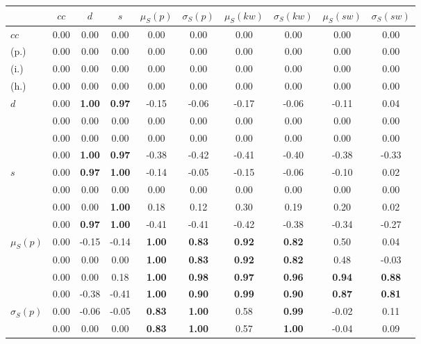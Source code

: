\begin{table*}[h!]
\begin{center}
\begin{tabular}{| l || c | c | c | c | c | c | c | c | c |}\hline
 & $cc$ & $d$ & $s$ & $\mu_S(p)$ & $\sigma_S(p)$ & $\mu_S(kw)$ & $\sigma_S(kw)$ & $\mu_S(sw)$ & $\sigma_S(sw)$ \\\hline\hline
$cc$ & 0.00  & 0.00  & 0.00  & 0.00  & 0.00  & 0.00  & 0.00  & 0.00  & 0.00 \\
(p.) & 0.00  & 0.00  & 0.00  & 0.00  & 0.00  & 0.00  & 0.00  & 0.00  & 0.00 \\
(i.) & 0.00  & 0.00  & 0.00  & 0.00  & 0.00  & 0.00  & 0.00  & 0.00  & 0.00 \\
(h.) & 0.00  & 0.00  & 0.00  & 0.00  & 0.00  & 0.00  & 0.00  & 0.00  & 0.00 \\\hline
$d$ & 0.00 & {\bf 1.00} & {\bf 0.97} & -0.15 & -0.06 & -0.17 & -0.06 & -0.11 & 0.04 \\
 & 0.00  & 0.00  & 0.00  & 0.00  & 0.00  & 0.00  & 0.00  & 0.00  & 0.00 \\\hline
 & 0.00  & 0.00  & 0.00  & 0.00  & 0.00  & 0.00  & 0.00  & 0.00  & 0.00 \\\hline
 & 0.00 & {\bf 1.00} & {\bf 0.97} & -0.38 & -0.42 & -0.41 & -0.40 & -0.38 & -0.33 \\\hline
$s$ & 0.00 & {\bf 0.97} & {\bf 1.00} & -0.14 & -0.05 & -0.15 & -0.06 & -0.10 & 0.02 \\
 & 0.00  & 0.00  & 0.00  & 0.00  & 0.00  & 0.00  & 0.00  & 0.00  & 0.00 \\\hline
 & 0.00 & 0.00 & {\bf 1.00} & 0.18 & 0.12 & 0.30 & 0.19 & 0.20 & 0.02 \\
 & 0.00 & {\bf 0.97} & {\bf 1.00} & -0.41 & -0.41 & -0.42 & -0.38 & -0.34 & -0.27 \\\hline
$\mu_S(p)$ & 0.00 & -0.15 & -0.14 & {\bf 1.00} & {\bf 0.83} & {\bf 0.92} & {\bf 0.82} & 0.50 & 0.04 \\
 & 0.00 & 0.00 & 0.00 & {\bf 1.00} & {\bf 0.83} & {\bf 0.92} & {\bf 0.82} & 0.48 & -0.03 \\
 & 0.00 & 0.00 & 0.18 & {\bf 1.00} & {\bf 0.98} & {\bf 0.97} & {\bf 0.96} & {\bf 0.94} & {\bf 0.88} \\
 & 0.00 & -0.38 & -0.41 & {\bf 1.00} & {\bf 0.90} & {\bf 0.99} & {\bf 0.90} & {\bf 0.87} & {\bf 0.81} \\\hline
$\sigma_S(p)$ & 0.00 & -0.06 & -0.05 & {\bf 0.83} & {\bf 1.00} & 0.58 & {\bf 0.99} & -0.02 & 0.11 \\
 & 0.00 & 0.00 & 0.00 & {\bf 0.83} & {\bf 1.00} & 0.57 & {\bf 1.00} & -0.04 & 0.09 \\

\end{tabular}
\end{center}
\end{table*}

